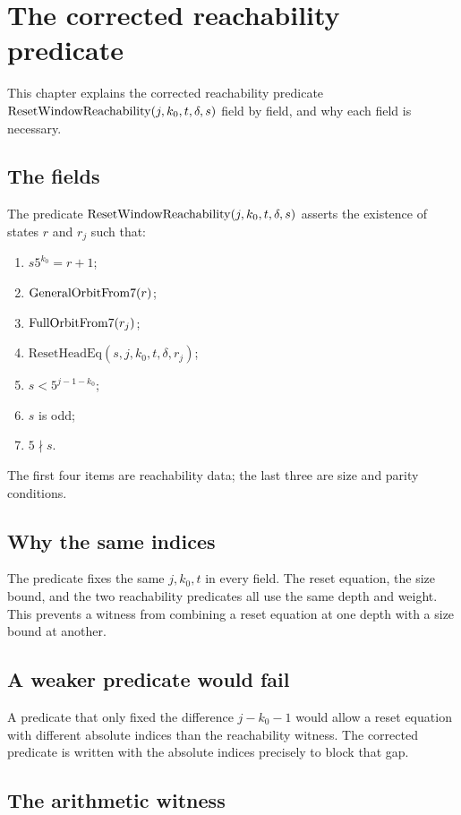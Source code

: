\section{The corrected reachability predicate}

This chapter explains the corrected reachability predicate
$\mathrm{ResetWindowReachability}(j,k_0,t,\delta,s)$ field by field, and why each field is
necessary.

\subsection{The fields}

The predicate $\mathrm{ResetWindowReachability}(j,k_0,t,\delta,s)$ asserts the existence
of states $r$ and $r_j$ such that:
\begin{enumerate}[leftmargin=*]
\item $s5^{k_0}=r+1$;
\item $\mathrm{GeneralOrbitFrom7}(r)$;
\item $\mathrm{FullOrbitFrom7}(r_j)$;
\item $\mathrm{ResetHeadEq}(s,j,k_0,t,\delta,r_j)$;
\item $s<5^{j-1-k_0}$;
\item $s$ is odd;
\item $5\nmid s$.
\end{enumerate}
The first four items are reachability data; the last three are size
and parity conditions.

\subsection{Why the same indices}

The predicate fixes the same $j,k_0,t$ in every field.  The reset
equation, the size bound, and the two reachability predicates all use
the same depth and weight.  This prevents a witness from combining a
reset equation at one depth with a size bound at another.

\subsection{A weaker predicate would fail}

A predicate that only fixed the difference $j-k_0-1$ would allow a
reset equation with different absolute indices than the reachability
witness.  The corrected predicate is written with the absolute
indices precisely to block that gap.

\subsection{The arithmetic witness}

